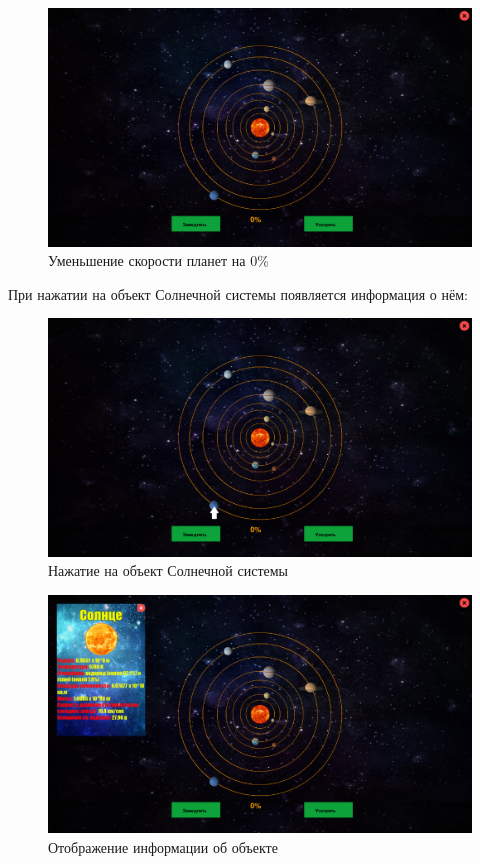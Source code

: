 \documentclass[14pt, oneside]{altsu-report}
\begin{document}
\begin{figure}[H]
    \centering
    \includegraphics[width=0.8\linewidth]{src/test/null.png}
    \caption{Уменьшение скорости планет на 0\%}
    \label{fig:up-0}
\end{figure}

При нажатии на объект Солнечной системы появляется информация о нём:
\begin{figure}[H]
    \centering
    \includegraphics[width=0.8\linewidth]{src/test/После_нажатия_на планету2.png}
    \caption{Нажатие на объект Солнечной системы}
    \label{fig:click-open}
\end{figure}
\begin{figure}[H]
    \centering
    \includegraphics[width=0.8\linewidth]{src/test/Нажатие_на_планету.png}
    \caption{Отображение информации об объекте}
    \label{fig:info}
\end{figure}
\end{document}
